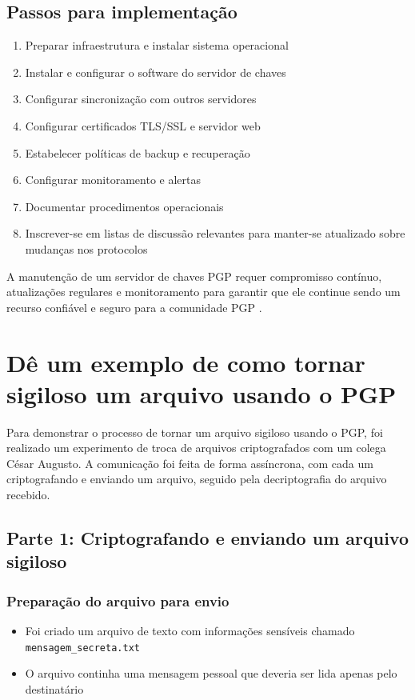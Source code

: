 \subsection{Passos para implementação}
\begin{enumerate}
    \item Preparar infraestrutura e instalar sistema operacional
    \item Instalar e configurar o software do servidor de chaves \cite{koch2018keyserver}
    \item Configurar sincronização com outros servidores
    \item Configurar certificados TLS/SSL e servidor web
    \item Estabelecer políticas de backup e recuperação
    \item Configurar monitoramento e alertas
    \item Documentar procedimentos operacionais
    \item Inscrever-se em listas de discussão relevantes para manter-se atualizado sobre mudanças nos protocolos
\end{enumerate}

A manutenção de um servidor de chaves PGP requer compromisso contínuo, atualizações regulares e monitoramento para garantir que ele continue sendo um recurso confiável e seguro para a comunidade PGP \cite{fiskerstrand2019guide}.

\section{Dê um exemplo de como tornar sigiloso um arquivo usando o PGP}

Para demonstrar o processo de tornar um arquivo sigiloso usando o PGP, foi realizado um experimento de troca de arquivos criptografados com um colega César Augusto. A comunicação foi feita de forma assíncrona, com cada um criptografando e enviando um arquivo, seguido pela decriptografia do arquivo recebido.

\subsection{Parte 1: Criptografando e enviando um arquivo sigiloso}

\subsubsection{Preparação do arquivo para envio}
\begin{itemize}
    \item Foi criado um arquivo de texto com informações sensíveis chamado \texttt{mensagem\_secreta.txt}
    \item O arquivo continha uma mensagem pessoal que deveria ser lida apenas pelo destinatário
\end{itemize}


